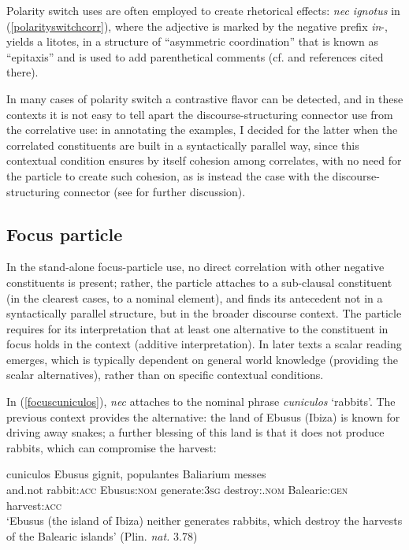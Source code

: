 \documentclass[output=paper]{langsci/langscibook}
\begin{document}
\noindent Polarity switch uses are often employed to create rhetorical effects: {\emph{nec ignotus}} in (\ref{polarityswitchcorr}), where the adjective is marked by the negative prefix {\emph{in}}-, yields a litotes, in a structure of ``asymmetric coordination'' that is known as ``epitaxis'' and is used to add parenthetical comments (cf. \citealt[]{OrlandiniPoccetti07} and references cited there).

In many cases of polarity switch a contrastive flavor can be detected, and in these contexts it is not easy to tell apart the discourse-structuring connector use from the correlative use: in annotating the examples, I decided for the latter when the correlated constituents are built in a syntactically parallel way, since this contextual condition ensures by itself cohesion among correlates, with no need for the particle to create such cohesion, as is instead the case with the discourse-structuring connector (see \citealt[]{OrlandiniPoccetti07} for further discussion).

\subsection{Focus particle} \label{functionfocusparticle}

In the stand-alone focus-particle use, no direct correlation with other negative constituents is present; rather, the particle attaches to a sub-clausal constituent (in the clearest cases, to a nominal element), and finds its antecedent not in a syntactically parallel structure, but in the broader discourse context. The particle requires for its interpretation that at least one alternative to the constituent in focus holds in the context (additive interpretation). In later texts a scalar reading emerges, which is typically dependent on general world knowledge (providing the scalar alternatives), rather than on specific contextual conditions.

In (\ref{focuscuniculos}), {\emph{nec}} attaches to the nominal phrase {\emph{cuniculos}} `rabbits'. The previous context provides the alternative: the land of Ebusus (Ibiza) is known for driving away snakes; a further blessing of this land is that it does not produce rabbits, which can compromise the harvest:

{\begin{exe}
\ex \label{focuscuniculos}  cuniculos Ebusus gignit, populantes Baliarium messes\\
and.not rabbit:{\textsc{acc}} Ebusus:{\textsc{nom}} generate:{\textsc{3sg}} destroy:{\ptcp}.{\textsc{nom}} Balearic:{\textsc{gen}} harvest:{\textsc{acc}}\\
\glt `Ebusus (the island of Ibiza) neither generates rabbits, which destroy the harvests of the Balearic islands' (Plin. {\emph{nat.}} 3.78)
\end{exe}}
\end{document}
